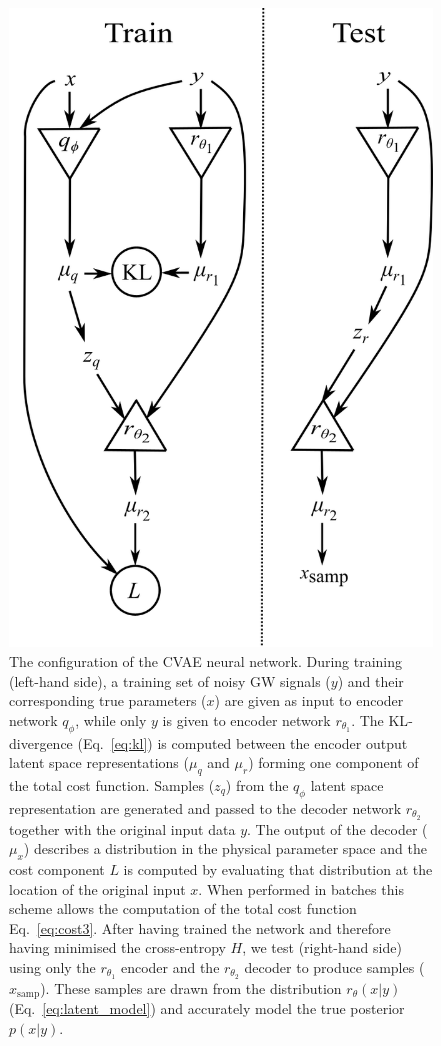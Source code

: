 \documentclass[%
showpacs,
nofootinbib,
 amsmath,amssymb,
 aps,
 twocolumn,
 prl,
 reprint,
floatfix,
]{revtex4-1}
\begin{document}
\begin{figure}
    \includegraphics[width=0.95\columnwidth]{network_setup.png}
    \caption{\label{fig:network_config} The configuration of the \ac{CVAE}
neural network. During training (left-hand side), a training set of noisy
\ac{GW} signals ($y$) and their corresponding true parameters ($x$) are given
as input to encoder network $q_{\phi}$, while only $y$ is given to
encoder network $r_{\theta_1}$. The \ac{KL}-divergence (Eq.~\ref{eq:kl})
is computed between the encoder output latent space representations
($\mu_q$ and $\mu_r$) forming one component of the total cost function. Samples
($z_q$) from the $q_{\phi}$ latent space representation are generated and
passed to the decoder network $r_{\theta_2}$ together with the original
input data $y$. The output of the decoder ($\mu_x$) describes a distribution in
the physical parameter space and the cost component $L$ is computed by
evaluating that distribution at the location of the original input $x$.
When performed in batches this scheme allows the computation of the total cost
function Eq.~\ref{eq:cost3}. After having trained the network and
therefore having minimised the cross-entropy $H$, we test (right-hand side)
using only the $r_{\theta_1}$ encoder and the $r_{\theta_2}$
decoder to produce samples ($x_{\text{samp}}$). These samples are drawn
from the distribution $r_{\theta}(x|y)$ (Eq.~\ref{eq:latent_model})
and accurately model the true posterior $p(x|y)$.}
\end{figure}
\end{document}
